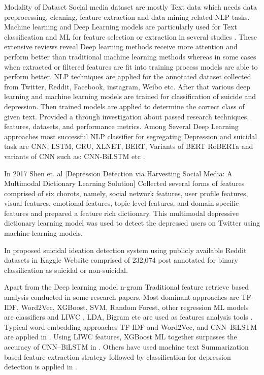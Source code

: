 \documentclass[12pt, letterpaper]{article}
\begin{document}
Modality of Dataset
Social media dataset are mostly Text data which needs data preprocessing, cleaning, feature extraction and data mining related NLP tasks. Machine learning and Deep Learning models are particularly used for Text classification and ML for feature selection or extraction in several studies \cite{castillo2020suicide, chancellor2020methods, zhang2022natural}. These extensive reviews reveal Deep learning methods receive more attention and perform better than traditional machine learning methods whereas in some cases when extracted or filtered features are fit into training process models are able to perform better. NLP techniques are applied for the annotated dataset collected from Twitter, Reddit, Facebook, instagram, Weibo \cite{wang2020depression} etc. After that various deep learning and machine learning models are trained for classification of suicide and depression. Then trained models are applied to determine the correct class of given text. \cite{malhotra2022deep} Provided a through investigation about passed research techniques, features, datasets, and performance metrics. \cite{zhang2022natural, chancellor2020methods} Among Several Deep Learning approaches most successful NLP classifier for segregating Depression and suicidal task are CNN, LSTM, GRU, XLNET, BERT, Variants of BERT RoBERTa and variants of CNN such as: CNN-BiLSTM etc \cite{aldhyani2022detecting, wang2020depression, shetty2020predicting} . 


In 2017 Shen et. al [Depression Detection via Harvesting Social Media: A Multimodal Dictionary Learning Solution] Collected several forms of features comprised of six chorots, namely, social network features, user profile features, visual features, emotional features, topic-level features, and domain-specific features and prepared a feature rich dictionary. This multimodal depressive dictionary learning model was used to detect the depressed users on Twitter using machine learning models. 

  

In \cite{aldhyani2022detecting} proposed suicidal ideation detection system using publicly available Reddit datasets in Kaggle Website comprised of 232,074 post annotated for binary classification as suicidal or non-suicidal. 

Apart from the Deep learning model n-gram Traditional feature retrieve based analysis conducted in some research papers. Most dominant approaches are TF-IDF, Word2Vec, XGBoost, SVM, Random Forest, other regression ML models are classifiers and LIWC \cite{pennebaker2001linguistic}, LDA, Bigram etc are used as features analysis tools \cite{tadesse2019detection}. Typical word embedding approaches TF-IDF and Word2Vec, and CNN–BiLSTM are applied in  \cite{aldhyani2022detecting}. Using LIWC features, XGBoost ML together surpasses the accuracy of CNN–BiLSTM in  \cite{aldhyani2022detecting}. Others have used machine text Summarization based feature extraction strategy followed by classification for depression detection is applied in \cite{zogan2021depressionnet}. 
\end{document}
